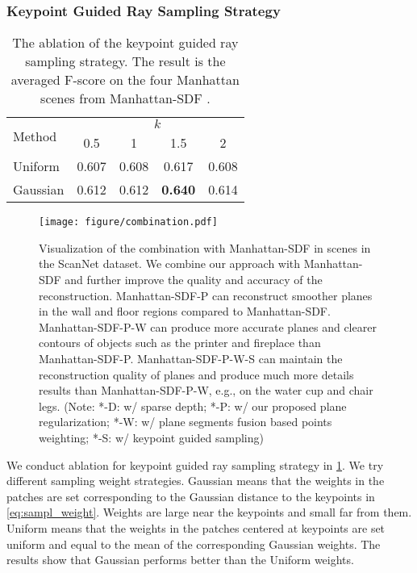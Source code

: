 \documentclass[10pt,journal,compsoc]{IEEEtran}
\begin{document}
\subsubsection{Keypoint Guided Ray Sampling Strategy}
\begin{table}[htbp]
	\centering
	\caption{The ablation of the keypoint guided ray sampling strategy. The result is the averaged F-score on the four Manhattan scenes from Manhattan-SDF \cite{guo2022neural}.}
	\begin{tabular}{l|cccc}
		\toprule
		\multirow{2}[4]{*}{Method} & \multicolumn{4}{c}{$k$} \\
		\cmidrule{2-5}          & 0.5   & 1     & 1.5   & 2 \\
		\midrule
		Uniform & 0.607 & 0.608 & 0.617 & 0.608 \\
		Gaussian & 0.612 & 0.612 & \textbf{0.640}  & 0.614 \\
		\bottomrule
	\end{tabular}%
	\label{tab:different_saml}
\end{table}
\begin{figure*}[htbp]
	\centering
	\texttt{[image: figure/combination.pdf]}
	\caption{Visualization of the combination with Manhattan-SDF in scenes in the ScanNet dataset. We combine our approach with Manhattan-SDF and further improve the quality and accuracy of the reconstruction. Manhattan-SDF-P can reconstruct smoother planes in the wall and floor regions compared to Manhattan-SDF. Manhattan-SDF-P-W can produce more accurate planes and clearer contours of objects such as the printer and fireplace than Manhattan-SDF-P. Manhattan-SDF-P-W-S can maintain the reconstruction quality of planes and produce much more details results than Manhattan-SDF-P-W, e.g., on the water cup and chair legs. (Note: *-D: w/ sparse depth; *-P: w/ our proposed plane regularization; *-W: w/ plane segments fusion based points weighting; *-S: w/ keypoint guided sampling)}
	\label{fig:combine}
\end{figure*}
We conduct ablation for keypoint guided ray sampling strategy in \cref{tab:different_saml}. We try different sampling weight strategies. Gaussian means that the weights in the patches are set corresponding to the Gaussian distance to the keypoints in \cref{eq:sampl_weight}. Weights are large near the keypoints and small far from them. Uniform means that the weights in the patches centered at keypoints are set uniform and equal to the mean of the corresponding Gaussian weights. The results show that Gaussian performs better than the Uniform weights.
\end{document}
